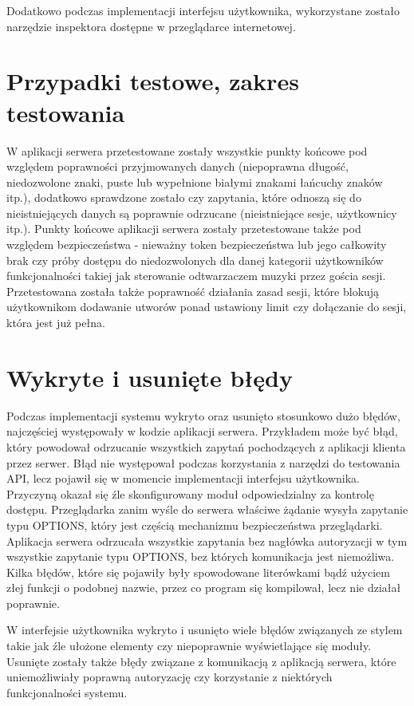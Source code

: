 Dodatkowo podczas implementacji interfejsu użytkownika, wykorzystane zostało narzędzie inspektora dostępne w przeglądarce internetowej.

\section{Przypadki testowe, zakres testowania}
W aplikacji serwera przetestowane zostały wszystkie punkty końcowe pod względem poprawności przyjmowanych danych (niepoprawna długość, niedozwolone znaki, puste lub wypełnione białymi znakami łańcuchy znaków itp.), dodatkowo sprawdzone zostało czy zapytania, które odnoszą się do nieistniejących danych są poprawnie odrzucane (nieistniejące sesje, użytkownicy itp.). Punkty końcowe aplikacji serwera zostały przetestowane także pod względem bezpieczeństwa - nieważny token bezpieczeństwa lub jego całkowity brak czy próby dostępu do niedozwolonych dla danej kategorii użytkowników funkcjonalności takiej jak sterowanie odtwarzaczem muzyki przez gościa sesji. Przetestowana została także poprawność działania zasad sesji, które blokują użytkownikom dodawanie utworów ponad ustawiony limit czy dołączanie do sesji, która jest już pełna.

\section{Wykryte i usunięte błędy}
Podczas implementacji systemu wykryto oraz usunięto stosunkowo dużo błędów, najczęściej występowały w kodzie aplikacji serwera. Przykładem może być błąd, który powodował odrzucanie wszystkich zapytań pochodzących z aplikacji klienta przez serwer. Błąd nie występował podczas korzystania z narzędzi do testowania API, lecz pojawił się w momencie implementacji interfejsu użytkownika. Przyczyną okazał się źle skonfigurowany moduł odpowiedzialny za kontrolę dostępu. Przeglądarka zanim wyśle do serwera właściwe żądanie wysyła zapytanie typu OPTIONS, który jest częścią mechanizmu bezpieczeństwa przeglądarki. Aplikacja serwera odrzucała wszystkie zapytania bez nagłówka autoryzacji w tym wszystkie zapytanie typu OPTIONS, bez których komunikacja jest niemożliwa. Kilka błędów, które się pojawiły były spowodowane literówkami bądź użyciem złej funkcji o podobnej nazwie, przez co program się kompilował, lecz nie działał poprawnie.

W interfejsie użytkownika wykryto i usunięto wiele błędów związanych ze stylem takie jak źle ułożone elementy czy niepoprawnie wyświetlające się moduły. Usunięte zostały także błędy związane z komunikacją z aplikacją serwera, które uniemożliwiały poprawną autoryzację czy korzystanie z niektórych funkcjonalności systemu.

